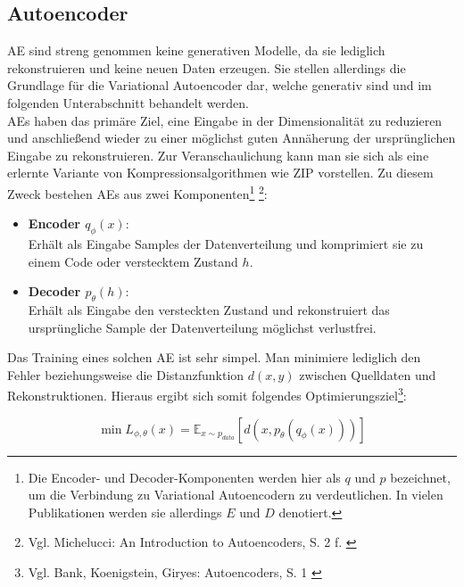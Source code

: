 \subsection{Autoencoder}

\ac{AE} sind streng genommen keine generativen Modelle, da sie lediglich rekonstruieren und keine neuen Daten erzeugen. Sie stellen allerdings die Grundlage für die Variational Autoencoder dar, welche generativ sind und im folgenden Unterabschnitt behandelt werden. \\ 
\ac{AE}s haben das primäre Ziel, eine Eingabe in der Dimensionalität zu reduzieren und anschließend wieder zu einer möglichst guten Annäherung der ursprünglichen Eingabe zu rekonstruieren. Zur Veranschaulichung kann man sie sich als eine erlernte Variante von Kompressionsalgorithmen wie ZIP vorstellen. 
Zu diesem Zweck bestehen \ac{AE}s aus zwei Komponenten\footnote{
    Die Encoder- und Decoder-Komponenten werden hier als $q$ und $p$ bezeichnet, um die Verbindung zu Variational Autoencodern zu verdeutlichen. In vielen Publikationen werden sie allerdings $E$ und $D$ denotiert.    
} \footnote{
    Vgl. Michelucci: An Introduction to Autoencoders, S. 2 f.
    \cite{michelucci2022introduction}
}:
\begin{itemize}
    \item \textbf{Encoder $q_\phi(x)$}: \\
    Erhält als Eingabe Samples der Datenverteilung und komprimiert sie zu einem Code oder verstecktem Zustand $h$.
    \item \textbf{Decoder $p_\theta(h)$}: \\
    Erhält als Eingabe den versteckten Zustand und rekonstruiert das ursprüngliche Sample der Datenverteilung möglichst verlustfrei.
\end{itemize}

Das Training eines solchen \ac{AE} ist sehr simpel. Man minimiere lediglich den Fehler beziehungsweise die Distanzfunktion $d(x, y)$ zwischen Quelldaten und Rekonstruktionen. Hieraus ergibt sich somit folgendes Optimierungsziel\footnote{
    Vgl. Bank, Koenigstein, Giryes: Autoencoders, S. 1
    \cite{bank2023autoencoders}
}:

\begin{equation}
    \min L_{\phi, \theta}(x) = \mathbb E _{x \sim p_{data}} 
    \left [ 
        d(x, p_\theta(q_\phi(x)))
    \right ]
\end{equation}

